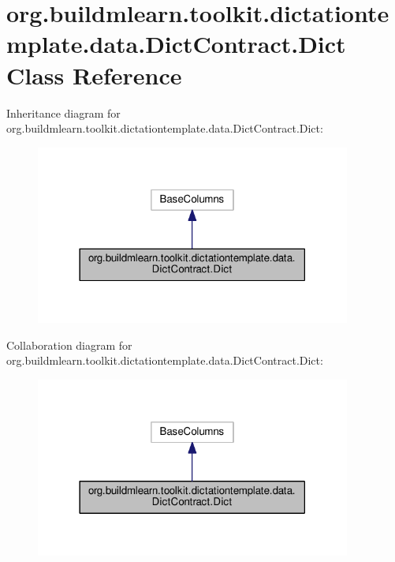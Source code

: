 \hypertarget{classorg_1_1buildmlearn_1_1toolkit_1_1dictationtemplate_1_1data_1_1DictContract_1_1Dict}{}\section{org.\+buildmlearn.\+toolkit.\+dictationtemplate.\+data.\+Dict\+Contract.\+Dict Class Reference}
\label{classorg_1_1buildmlearn_1_1toolkit_1_1dictationtemplate_1_1data_1_1DictContract_1_1Dict}


Inheritance diagram for org.\+buildmlearn.\+toolkit.\+dictationtemplate.\+data.\+Dict\+Contract.\+Dict\+:
\nopagebreak
\begin{figure}[H]
\begin{center}
\leavevmode
\includegraphics[width=294pt]{classorg_1_1buildmlearn_1_1toolkit_1_1dictationtemplate_1_1data_1_1DictContract_1_1Dict__inherit__graph}
\end{center}
\end{figure}


Collaboration diagram for org.\+buildmlearn.\+toolkit.\+dictationtemplate.\+data.\+Dict\+Contract.\+Dict\+:
\nopagebreak
\begin{figure}[H]
\begin{center}
\leavevmode
\includegraphics[width=294pt]{classorg_1_1buildmlearn_1_1toolkit_1_1dictationtemplate_1_1data_1_1DictContract_1_1Dict__coll__graph}
\end{center}
\end{figure}
